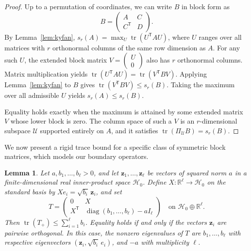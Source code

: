 \documentclass[11pt]{article}
\newtheorem{lemma}[theorem]{Lemma}
\newcommand{\R}{\mathbb{R}}
\newcommand{\tr}{\operatorname{tr}}
\newcommand{\diag}{\operatorname{diag}}
\newcommand{\scrH}{\mathscr{H}}
\newcommand{\scrU}{\mathscr{U}}
\begin{document}
	\begin{proof}
		Up to a permutation of coordinates, we can write \(B\) in block form as
		\[
		B = \begin{pmatrix} A & C \\ C^{\mathsf T} & D \end{pmatrix}.
		\]
		By Lemma~\ref{lem:kyfan}, \(s_r(A) = \max_U \tr(U^{\mathsf T} A U)\), where \(U\) ranges over all matrices with \(r\) orthonormal columns of the same row dimension as \(A\).
		For any such \(U\), the extended block matrix \(V = \begin{pmatrix} U \\ 0 \end{pmatrix}\) also has \(r\) orthonormal columns. Matrix multiplication yields
$\tr(U^{\mathsf T} A U) = \tr(V^{\mathsf T} B V).$
Applying Lemma~\ref{lem:kyfan} to \(B\) gives \(\tr(V^{\mathsf T} B V) \le s_r(B)\). Taking the maximum over all admissible \(U\) yields \(s_r(A) \le s_r(B)\).
		
		Equality holds exactly when the maximum is attained by some extended matrix \(V\) whose lower block is zero. The column space of such a \(V\) is an \(r\)-dimensional subspace \(\scrU\) supported entirely on \(A\), and it satisfies \(\tr(\Pi_{\scrU}B)=s_r(B)\).
	\end{proof}
	

We now present a rigid trace bound for a specific class of symmetric block matrices, which models our boundary operators.
\begin{lemma}\label{lem:positive-excess-rigidity}
Let \(a, b_1, \ldots, b_\ell > 0\), and let \(\mathbf z_1, \ldots, \mathbf z_\ell\) be vectors of squared norm \(a\) in a finite-dimensional real inner-product space \(\scrH_0\). Define \(X:\R^\ell\to\scrH_0\) on the standard basis by \(Xe_i=\sqrt{b_i}\,\mathbf z_i\), and set
		\[
		T=
		\begin{pmatrix}
			0&X\\
			X^{\mathsf T}&\diag(b_1,\ldots,b_\ell)-aI_\ell
		\end{pmatrix}
		\quad\text{on }\scrH_0\oplus\R^\ell.
		\]
		Then \(\tr(T_+)\le\sum_{i=1}^{\ell}b_i\). Equality holds if and only if the vectors \(\mathbf z_i\) are pairwise orthogonal. In this case, the nonzero eigenvalues of \(T\) are \(b_1,\ldots,b_\ell\) with respective eigenvectors \((\mathbf z_i,\sqrt{b_i}\,e_i)\), and \(-a\) with multiplicity \(\ell\).
	\end{lemma}
	
\end{document}
